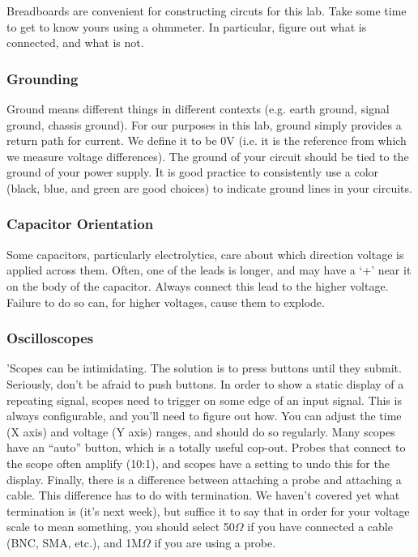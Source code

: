 \documentclass[11pt]{article}
\begin{document}
Breadboards are convenient for constructing circuts for this lab.  Take some time to get to know yours
using a ohmmeter.  In particular, figure out what is connected, and what is not.

\subsubsection*{Grounding}

Ground means different things in different contexts (e.g. earth ground, signal ground,
chassis ground).  For our purposes in
this lab, ground simply provides a return path for current.  We define it to be
0V (i.e. it is the reference from which we measure voltage differences).  The
ground of your circuit should be tied to the ground of your power supply.  It
is good practice to consistently use a color (black, blue, and green are good
choices) to indicate ground lines in your circuits.

\subsubsection*{Capacitor Orientation}

Some capacitors, particularly electrolytics, care about which direction voltage
is applied across them.  Often, one of the leads is longer, and may have a `+'
near it on the body of the capacitor.  Always connect this lead to the higher voltage.
Failure to do so can, for higher voltages, cause them to explode.

\subsubsection*{Oscilloscopes}

'Scopes can be intimidating.  The solution is to press buttons until they submit.  Seriously, don't be afraid
to push buttons.  In order to show a static display of a repeating signal, scopes need to trigger on
some edge of an input signal.  This is always configurable, and you'll need to figure out how.  You can
adjust the time (X axis) and voltage (Y axis) ranges, and should do so regularly.  Many scopes have an ``auto''
button, which is a totally useful cop-out.  Probes that connect to the scope often amplify
(10:1), and scopes have a setting to undo this for the display.  Finally, there is a difference between
attaching a probe and attaching a cable.  This difference has to do with termination.  We haven't covered yet
what termination is (it's next week), but suffice it to say that in order for your voltage scale to mean
something, you should select 50$\Omega$ if you have connected a cable (BNC, SMA, etc.), and 1M$\Omega$ if
you are using a probe.
\end{document}
